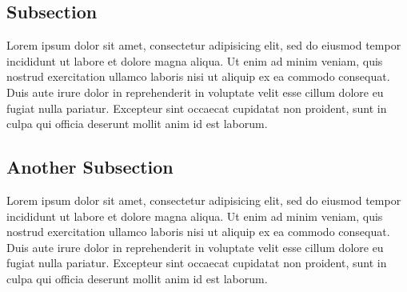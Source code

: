 \documentclass[a4paper, 10pt, twoside, dvipsnames]{article}
\begin{document}
\begin{multicols}{2}
\subsection{Subsection}
Lorem ipsum dolor sit amet, consectetur adipisicing elit, sed do eiusmod tempor incididunt ut labore et dolore magna aliqua. Ut enim ad minim veniam, quis nostrud exercitation ullamco laboris nisi ut aliquip ex ea commodo consequat. Duis aute irure dolor in reprehenderit in voluptate velit esse cillum dolore eu fugiat nulla pariatur. Excepteur sint occaecat cupidatat non proident, sunt in culpa qui officia deserunt mollit anim id est laborum. 

\subsection{Another Subsection}
Lorem ipsum dolor sit amet, consectetur adipisicing elit, sed do eiusmod tempor incididunt ut labore et dolore magna aliqua. Ut enim ad minim veniam, quis nostrud exercitation ullamco laboris nisi ut aliquip ex ea commodo consequat. Duis aute irure dolor in reprehenderit in voluptate velit esse cillum dolore eu fugiat nulla pariatur. Excepteur sint occaecat cupidatat non proident, sunt in culpa qui officia deserunt mollit anim id est laborum. 

\printbibliography

\label{lastpage}

\end{multicols}
\end{document}
